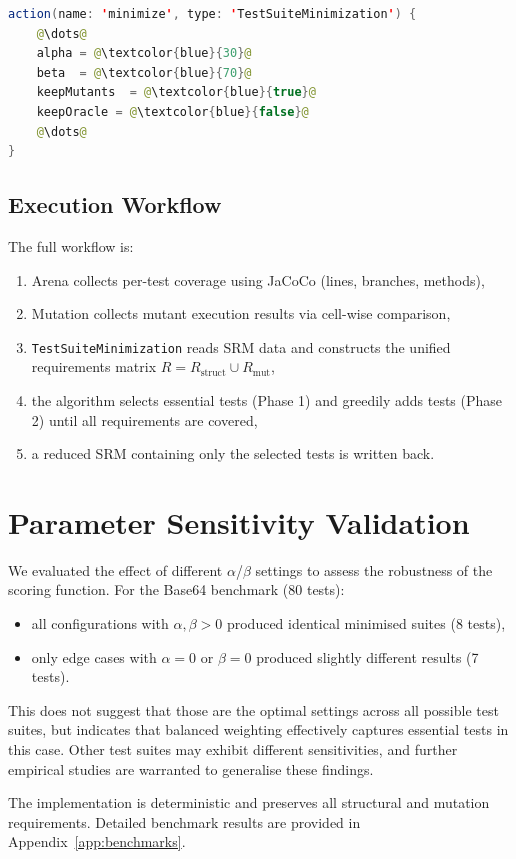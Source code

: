 \begin{lstlisting}[language=Java,caption={LSL configuration for the minimisation action. Note that for alpha and beta 30 means 0.3 and 70 means 0.7 for the formula},label={lst:lsl-min},basicstyle=\small\ttfamily,escapechar=@]
action(name: 'minimize', type: 'TestSuiteMinimization') {
    @\dots@
    alpha = @\textcolor{blue}{30}@
    beta  = @\textcolor{blue}{70}@
    keepMutants  = @\textcolor{blue}{true}@
    keepOracle = @\textcolor{blue}{false}@
    @\dots@
}
\end{lstlisting}

\subsection{Execution Workflow}

The full workflow is:

\begin{enumerate}
  \item Arena collects per-test coverage using JaCoCo (lines, branches, methods),
  \item Mutation collects mutant execution results via cell-wise comparison,
  \item \texttt{TestSuiteMinimization} reads SRM data and constructs the unified requirements matrix $R = R_{\text{struct}} \cup R_{\text{mut}}$,
  \item the algorithm selects essential tests (Phase 1) and greedily adds tests (Phase 2) until all requirements are covered,
  \item a reduced SRM containing only the selected tests is written back.
\end{enumerate}

\section{Parameter Sensitivity Validation}

We evaluated the effect of different $\alpha$/$\beta$ settings to assess the robustness of the scoring function. For the Base64 benchmark (80 tests):

\begin{itemize}
  \item all configurations with $\alpha,\beta>0$ produced identical minimised suites (8 tests),
  \item only edge cases with $\alpha=0$ or $\beta=0$ produced slightly different results (7 tests).
\end{itemize}

This does not suggest that those are the optimal settings across all possible test suites, but indicates that balanced weighting effectively captures essential tests in this case. Other test suites may exhibit different sensitivities, and further empirical studies are warranted to generalise these findings.

The implementation is deterministic and preserves all structural and mutation requirements. Detailed benchmark results are provided in Appendix~\ref{app:benchmarks}.
